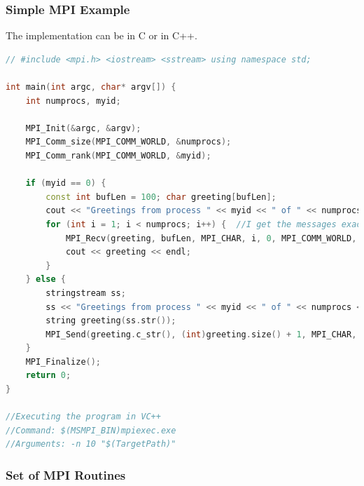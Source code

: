 \clearpage
\hypertarget{simple-mpi-example}{%
\subsubsection{Simple MPI Example}\label{simple-mpi-example}}

The implementation can be in C or in C++.

\begin{lstlisting}[language=C++]
// #include <mpi.h> <iostream> <sstream> using namespace std;

int main(int argc, char* argv[]) {
    int numprocs, myid;

    MPI_Init(&argc, &argv);
    MPI_Comm_size(MPI_COMM_WORLD, &numprocs);
    MPI_Comm_rank(MPI_COMM_WORLD, &myid);

    if (myid == 0) {
        const int bufLen = 100; char greeting[bufLen];
        cout << "Greetings from process " << myid << " of " << numprocs << " processes!" << endl;
        for (int i = 1; i < numprocs; i++) {  //I get the messages exactly in the order in which I want here (from i = 1 to numprocs)
            MPI_Recv(greeting, bufLen, MPI_CHAR, i, 0, MPI_COMM_WORLD, MPI_STATUS_IGNORE);  //In this case, MPI_Recv is blocking. There are also non-blocking implementations
            cout << greeting << endl;
        }
    } else {
        stringstream ss;
        ss << "Greetings from process " << myid << " of " << numprocs << " processes!";
        string greeting(ss.str());
        MPI_Send(greeting.c_str(), (int)greeting.size() + 1, MPI_CHAR, 0, 0, MPI_COMM_WORLD);
    }
    MPI_Finalize();
    return 0;
}

//Executing the program in VC++
//Command: $(MSMPI_BIN)mpiexec.exe
//Arguments: -n 10 "$(TargetPath)"
\end{lstlisting}

\hypertarget{set-of-mpi-routines}{%
\subsubsection{Set of MPI Routines}\label{set-of-mpi-routines}}

